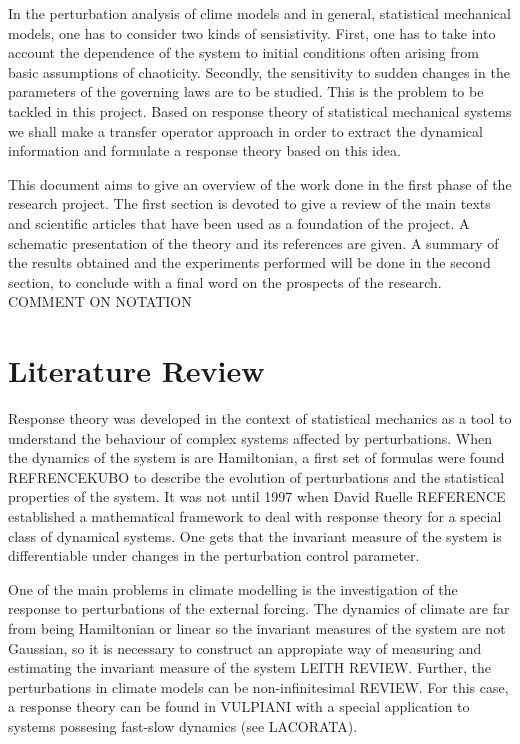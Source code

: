 
\noindent In the perturbation analysis of clime models and in general, statistical mechanical models, one has to consider two kinds of sensistivity. First, one has to take into account the dependence of the system to initial conditions often arising from basic assumptions of chaoticity. Secondly, the sensitivity to sudden changes in the parameters of the governing laws are to be studied. This is the problem to be tackled in this project. Based on response theory of statistical mechanical systems we shall make a transfer operator approach in order to extract the dynamical information and formulate a response theory based on this idea.

This document aims to give an overview of the work done in the first phase of the research project. The first section is devoted to give a review of the main texts and scientific articles that have been used as a foundation of the project. A schematic presentation of the theory and its references are given. A summary of the results obtained and the experiments performed will be done in the second section, to conclude with a final word on the prospects of the research.
COMMENT ON NOTATION


\section*{Literature Review}

Response theory was developed in the context of statistical mechanics as a tool to understand the behaviour of complex systems affected by perturbations. When the dynamics of the system is are Hamiltonian, a first set of formulas were found REFRENCEKUBO to describe the evolution of perturbations and the statistical properties of the system. It was not until 1997 when David Ruelle REFERENCE established a mathematical framework to deal with response theory for a special class of dynamical systems. One gets that the invariant measure of the system is differentiable under changes in the perturbation control parameter.

One of the main problems in climate modelling is the investigation of the response to perturbations of the external forcing. The dynamics of climate are far from being Hamiltonian or linear so the invariant measures of the system are not Gaussian, so it is necessary to construct an appropiate way of measuring and estimating the invariant measure of the system LEITH REVIEW. Further, the perturbations in climate models can be non-infinitesimal REVIEW. For this case, a response theory can be found in VULPIANI with a special application to systems possesing fast-slow dynamics (see LACORATA).


